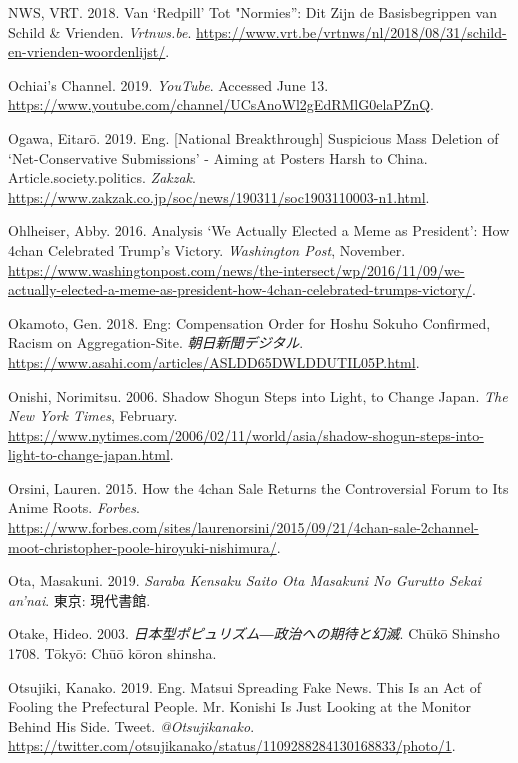 \documentclass[10pt,british,A4paper,,openany]{memoir}
\begin{document}
\hypertarget{ref-nws_van_2018}{}
NWS, VRT. 2018. Van `Redpill' Tot "Normies'': Dit Zijn de Basisbegrippen
van Schild \& Vrienden. \emph{Vrtnws.be}.
\url{https://www.vrt.be/vrtnws/nl/2018/08/31/schild-en-vrienden-woordenlijst/}.

\hypertarget{ref-noauthor_ochiais_nodate}{}
Ochiai's Channel. 2019. \emph{YouTube}. Accessed June 13.
\url{https://www.youtube.com/channel/UCsAnoWl2gEdRMlG0elaPZnQ}.

\hypertarget{ref-ogawa_eng._2019}{}
Ogawa, Eitarō. 2019. Eng. {[}National Breakthrough{]} Suspicious Mass
Deletion of `Net-Conservative Submissions' - Aiming at Posters Harsh to
China. Article.society.politics. \emph{Zakzak}.
\url{https://www.zakzak.co.jp/soc/news/190311/soc1903110003-n1.html}.

\hypertarget{ref-ohlheiser_analysis_2016}{}
Ohlheiser, Abby. 2016. Analysis `We Actually Elected a Meme as
President': How 4chan Celebrated Trump's Victory. \emph{Washington
Post}, November.
\url{https://www.washingtonpost.com/news/the-intersect/wp/2016/11/09/we-actually-elected-a-meme-as-president-how-4chan-celebrated-trumps-victory/}.

\hypertarget{ref-okamoto_eng:_2018}{}
Okamoto, Gen. 2018. Eng: Compensation Order for Hoshu Sokuho Confirmed,
Racism on Aggregation-Site. \emph{朝日新聞デジタル}.
\url{https://www.asahi.com/articles/ASLDD65DWLDDUTIL05P.html}.

\hypertarget{ref-onishi_shadow_2006}{}
Onishi, Norimitsu. 2006. Shadow Shogun Steps into Light, to Change
Japan. \emph{The New York Times}, February.
\url{https://www.nytimes.com/2006/02/11/world/asia/shadow-shogun-steps-into-light-to-change-japan.html}.

\hypertarget{ref-orsini_how_2015}{}
Orsini, Lauren. 2015. How the 4chan Sale Returns the Controversial Forum
to Its Anime Roots. \emph{Forbes}.
\url{https://www.forbes.com/sites/laurenorsini/2015/09/21/4chan-sale-2channel-moot-christopher-poole-hiroyuki-nishimura/}.

\hypertarget{ref-ota_saraba_2019}{}
Ota, Masakuni. 2019. \emph{Saraba Kensaku Saito Ota Masakuni No Gurutto
Sekai an'nai}. 東京: 現代書館.

\hypertarget{ref-otake__2003}{}
Otake, Hideo. 2003. \emph{日本型ポピュリズム―政治への期待と幻滅}. Chūkō
Shinsho 1708. Tōkyō: Chūō kōron shinsha.

\hypertarget{ref-otsujiki_eng._2019}{}
Otsujiki, Kanako. 2019. Eng. Matsui Spreading Fake News. This Is an Act
of Fooling the Prefectural People. Mr. Konishi Is Just Looking at the
Monitor Behind His Side. Tweet. \emph{@Otsujikanako}.
\url{https://twitter.com/otsujikanako/status/1109288284130168833/photo/1}.
\end{document}
